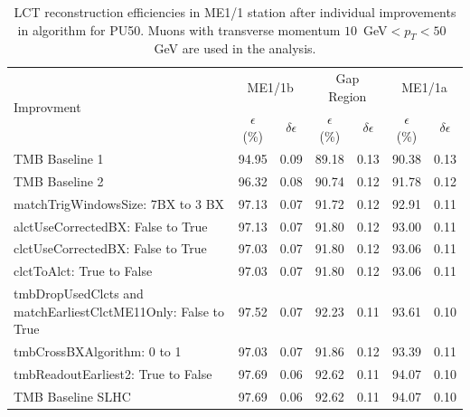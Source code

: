 \begin{table}[h]
\begin{tabular}{| p{7.4 cm}| c | c | c | c | c | c | }
\hline
\multirow{2}{*}{Improvment} & \multicolumn {2}{|c|}{ME1/1b} & \multicolumn{2}{|c|}{Gap Region} & \multicolumn{2}{|c|}{ME1/1a} \\ \cline{2-7}
                            & $\epsilon$ (\%)  & $\delta \epsilon$ & $\epsilon$ (\%) & $\delta \epsilon$ & $\epsilon$ (\%) & $\delta \epsilon$ \\  \hline
TMB Baseline 1 & 94.95 & 0.09 & 89.18 & 0.13 & 90.38 & 0.13 \\ \hline
TMB Baseline 2 & 96.32 & 0.08 & 90.74 & 0.12 & 91.78 & 0.12 \\ \hline
matchTrigWindowsSize: 7BX to 3 BX & 97.13 & 0.07 & 91.72 & 0.12 & 92.91 & 0.11 \\ \hline
alctUseCorrectedBX: False to True & 97.13 & 0.07 & 91.80 & 0.12 & 93.00 & 0.11 \\ \hline
clctUseCorrectedBX: False to True & 97.03 & 0.07 & 91.80 & 0.12 & 93.06 & 0.11 \\ \hline
clctToAlct: True to False & 97.03 & 0.07 & 91.80 & 0.12 & 93.06 & 0.11 \\ \hline
tmbDropUsedClcts and matchEarliestClctME11Only: False to True & 97.52 & 0.07 & 92.23 & 0.11 & 93.61 & 0.10 \\ \hline
tmbCrossBXAlgorithm: 0 to 1 & 97.03 & 0.07 & 91.86 & 0.12 & 93.39 & 0.11 \\ \hline
tmbReadoutEarliest2: True to False & 97.69 & 0.06 & 92.62 & 0.11 & 94.07 & 0.10 \\ \hline 
TMB Baseline SLHC & 97.69 & 0.06 & 92.62 & 0.11 & 94.07 & 0.10 \\ \hline 
\end{tabular}
\caption{LCT reconstruction efficiencies in ME1/1 station after individual improvements in algorithm for PU50. Muons with transverse momentum $10$~GeV$<p_T<50$~ GeV are used in the analysis.}
\label{eff_pu50}
\end{table}
